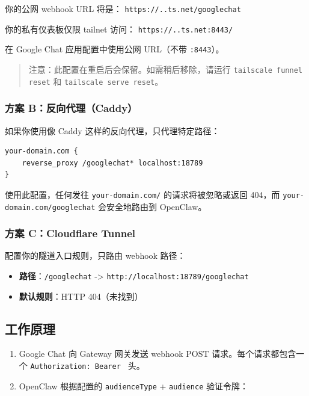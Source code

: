 你的公网 webhook URL 将是：
\texttt{https://..ts.net/googlechat}

你的私有仪表板仅限 tailnet 访问：
\texttt{https://..ts.net:8443/}

在 Google Chat 应用配置中使用公网 URL（不带 \texttt{:8443}）。

\begin{quote}
注意：此配置在重启后会保留。如需稍后移除，请运行 \texttt{tailscale funnel reset} 和 \texttt{tailscale serve reset}。
\end{quote}


\subsubsection{方案 B：反向代理（Caddy）}


如果你使用像 Caddy 这样的反向代理，只代理特定路径：

\begin{lstlisting}
your-domain.com {
    reverse_proxy /googlechat* localhost:18789
}
\end{lstlisting}


使用此配置，任何发往 \texttt{your-domain.com/} 的请求将被忽略或返回 404，而 \texttt{your-domain.com/googlechat} 会安全地路由到 OpenClaw。

\subsubsection{方案 C：Cloudflare Tunnel}


配置你的隧道入口规则，只路由 webhook 路径：

\begin{itemize}
  \item \textbf{路径}：\texttt{/googlechat} -> \texttt{http://localhost:18789/googlechat}
  \item \textbf{默认规则}：HTTP 404（未找到）
\end{itemize}


\subsection{工作原理}


\begin{enumerate}
  \item Google Chat 向 Gateway 网关发送 webhook POST 请求。每个请求都包含一个 \texttt{Authorization: Bearer } 头。
  \item OpenClaw 根据配置的 \texttt{audienceType} + \texttt{audience} 验证令牌：
\end{enumerate}

